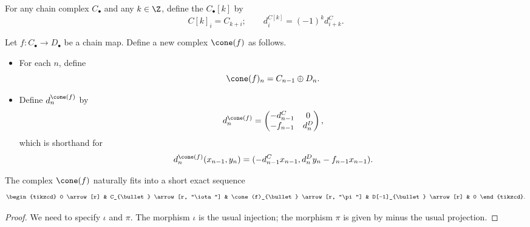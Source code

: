 \documentclass[main.tex]{subfiles}
\begin{document}
\begin{definition}
  \label{def:shift_functor}
  For any chain complex $C_{\bullet}$ and any $k \in \Z$, define the  $C_{\bullet}[k]$ by
  \begin{equation*}
    C[k]_{i} = C_{k+i};\qquad d^{C[k]}_{i} = (-1)^{k}d^{C}_{i+k}.
  \end{equation*}
\end{definition}

\begin{definition}
  \label{def:mapping_cone}
  Let $f\colon C_{\bullet} \to D_{\bullet}$ be a chain map. Define a new complex $\cone(f)$ as follows.
  \begin{itemize}
    \item For each $n$, define
      \begin{equation*}
        \cone(f)_{n} = C_{n-1} \oplus D_{n}.
      \end{equation*}

    \item Define $d^{\cone(f)}_{n}$ by
      \begin{equation*}
        d^{\cone(f)}_{n} =
        \begin{pmatrix}
          -d^{C}_{n-1} & 0 \\
          -f_{n-1} & d^{D}_{n}
        \end{pmatrix},
      \end{equation*}
      which is shorthand for
      \begin{equation*}
        d^{\cone(f)}_{n}(x_{n-1}, y_{n}) = (-d^{C}_{n-1}x_{n-1}, d^{D}_{n}y_{n} - f_{n-1}x_{n-1}).
      \end{equation*}
  \end{itemize}
\end{definition}

\begin{lemma}
  \label{lemma:cone_fits_into_ses}
  The complex $\cone(f)$ naturally fits into a short exact sequence
  \begin{equation*}
    \begin{tikzcd}
      0
      \arrow[r]
      & C_{\bullet}
      \arrow[r, "\iota"]
      & \cone(f)_{\bullet}
      \arrow[r, "\pi"]
      & D[-1]_{\bullet}
      \arrow[r]
      & 0
    \end{tikzcd}.
  \end{equation*}
\end{lemma}
\begin{proof}
  We need to specify $\iota$ and $\pi$. The morphism $\iota$ is the usual injection; the morphism $\pi$ is given by minus the usual projection.
\end{proof}
\end{document}
